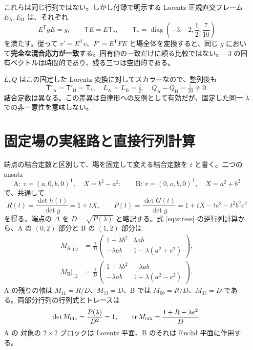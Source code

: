 \documentclass[11pt,a4paper]{article}
\newcommand{\diag}{\operatorname{diag}}
\newcommand{\Tmix}{\mathsf T}
\begin{document}
これらは同じ行列ではない。しかし付録で明示する Lorentz 正規直交フレーム $E_{\mathrm A},E_{\mathrm B}$ は、それぞれ
\begin{equation}\label{eq:alignment}
E^{\mathsf T}gE=g,\qquad \Tmix E=E\Tmix_*,\qquad
\Tmix_* =\diag\left(-3,-2,\frac12,\frac7{10}\right)
\end{equation}
を満たす。従って $v'=E^{\mathsf T}v$、$F'=E^{\mathsf T}FE$ と場全体を変換すると、同じ $g$ において\textbf{完全な混合応力が一致}する。固有値の一致だけに頼る比較ではない。$-3$ の固有ベクトルは時間的であり、残る三つは空間的である。

$L,Q$ はこの固定した Lorentz 変換に対してスカラーなので、整列後も
\begin{equation}\label{eq:gap}
\boxed{\Tmix'_{\mathrm A}=\Tmix'_{\mathrm B}=\Tmix_*,\quad
L_{\mathrm A}=L_{\mathrm B}=\tfrac12,\quad Q_{\mathrm A}-Q_{\mathrm B}=\tfrac7{20}\ne0 .}
\end{equation}
結合定数は異なる。この差異は自律形への反例として有効だが、固定した同一 $\lambda$ での非一意性を意味しない。

\newpage
\section{固定場の実経路と直接行列計算}
端点の結合定数と区別して、場を固定して変える結合定数を $t$ と書く。二つの ansatz
\begin{equation}\label{eq:ansatz}
\mathrm A:\ v=(a,0,b,0)^{\mathsf T},\quad X=b^2-a^2;\qquad
\mathrm B:\ v=(0,a,b,0)^{\mathsf T},\quad X=a^2+b^2
\end{equation}
で、共通して
\begin{equation}\label{eq:paths}
R(t)=\frac{\det h(t)}{\det g}=1+tX,\qquad
P(t)=\frac{\det G(t)}{\det g}=1+tX-te^2-t^2b^2e^2
\end{equation}
を得る。端点の $\Delta$ を $D=\sqrt{P(\lambda)}$ と略記する。式 \eqref{eq:stress} の逆行列計算から、A の $(0,2)$ 部分と B の $(1,2)$ 部分は
\begin{equation}\label{eq:blocks}
\begin{aligned}
M_{\mathrm A}|_{02}&=\frac1D\begin{pmatrix}
1+\lambda b^2&\lambda ab\\
-\lambda ab&1-\lambda(a^2+e^2)
\end{pmatrix},\\
M_{\mathrm B}|_{12}&=\frac1D\begin{pmatrix}
1+\lambda b^2&-\lambda ab\\
-\lambda ab&1+\lambda(a^2-e^2)
\end{pmatrix}.
\end{aligned}
\end{equation}
A の残りの軸は $M_{11}=R/D$、$M_{33}=D$、B では $M_{00}=R/D$、$M_{33}=D$ である。両部分行列の行列式とトレースは
\begin{equation}\label{eq:block-invariants}
\det M_{\rm blk}=\frac{P(\lambda)}{D^2}=1,\qquad
\operatorname{tr}M_{\rm blk}=\frac{1+R-\lambda e^2}{D} .
\end{equation}
A の 対象の $2\times2$ ブロックは Lorentz 平面、B のそれは Euclid 平面に作用する。
\end{document}
